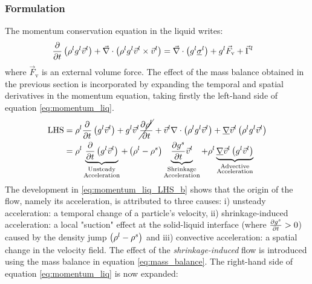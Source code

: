 \subsubsection{Formulation}
The momentum conservation equation in the liquid writes:
\begin{align}
\label{eq:momentum_liq}
& \frac{\partial}{\partial t} \left( \rho^l {g^l} \vec{v}^l  \right)  + \vec{\nabla} \cdot \left( \rho^l {g^l} \vec{v}^l \times \vec{v}^l \right) = 
	\vec{\nabla} \cdot \left( {g^l} \underline{\sigma}^l \right) + {g^l} \vec{F}_\text{v} + \vec{\Gamma}^{l}
\end{align}
where $\vec{F}_\text{v}$ is an external volume force. The effect of the mass balance obtained in the previous section 
is incorporated by expanding the temporal and spatial derivatives in the momentum equation, taking firstly the left-hand side of equation \eqref{eq:momentum_liq}.
\begin{subequations}
\begin{align}
\label{eq:momentum_liq_LHS_a}
	 \text{LHS} &=
	 \rho^l \frac{\partial}{\partial t} \left(  {g^l} \vec{v}^l  \right)  + {g^l} \vec{v}^l \cancel{\frac{\partial \rho^l}{\partial t}} 
	+ \vec{v}^l \nabla \cdot \left(  \rho^l {g^l} \vec{v}^l  \right) 
	+ \underline{\nabla} \vec{v}^l \left(  \rho^l {g^l} \vec{v}^l  \right) \\
\label{eq:momentum_liq_LHS_b}
	&= \rho^l \underbrace{ \frac{\partial}{\partial t} \left(  {g^l} \vec{v}^l  \right)  }_{\substack{\text{Unsteady} \\ \text{Acceleration}}}
	 + \left(  \rho^l - \rho^s  \right) \underbrace{ \frac{\partial  {g^s} }{\partial t} \vec{v}^l}
	    _{\substack{\text{Shrinkage}\\ \text{Acceleration}}}
	+ \rho^l  \underbrace{ \underline{\nabla} \vec{v}^l \left(  {g^l} \vec{v}^l  \right)}_{\substack{\text{Advective} \\ \text{Acceleration}}}     
\end{align}
\end{subequations}
The development in \eqref{eq:momentum_liq_LHS_b} shows that the origin of the flow, namely its acceleration, is 
attributed to three causes: 
 i) unsteady acceleration: a temporal change of a particle's velocity, ii) shrinkage-induced acceleration: a local "suction" effect at the solid-liquid interface (where $\frac{\partial  {g^s} }{\partial t} >0$) caused by the density jump $\left(  \rho^l - \rho^s  \right)$
and iii) convective acceleration: a spatial change in the velocity field.
The effect of the \emph{shrinkage-induced} flow is introduced using the mass balance in equation \eqref{eq:mass_balance}. The right-hand side of equation \eqref{eq:momentum_liq} is now expanded:
